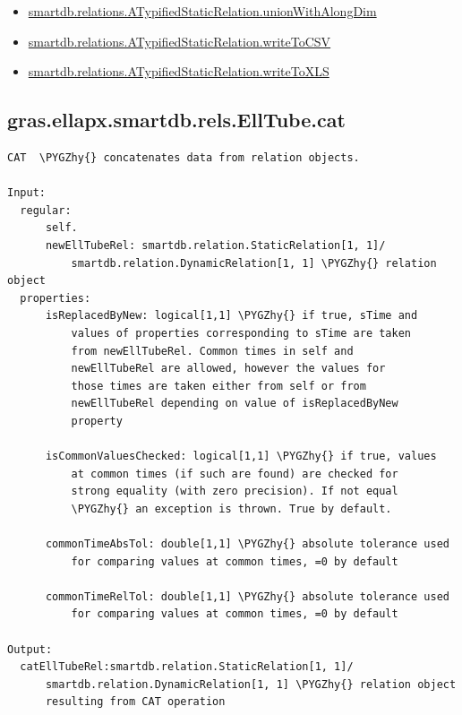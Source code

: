 \documentclass[letterpaper,10pt,english]{sphinxmanual}
\def\PYGZhy{\char`\-}
\begin{document}
\begin{itemize}
\item {} 
{\hyperref[chap_functions:smartdb-relations-atypifiedstaticrelation-unionwithalongdim]{smartdb.relations.ATypifiedStaticRelation.unionWithAlongDim}}

\item {} 
{\hyperref[chap_functions:smartdb-relations-atypifiedstaticrelation-writetocsv]{smartdb.relations.ATypifiedStaticRelation.writeToCSV}}

\item {} 
{\hyperref[chap_functions:smartdb-relations-atypifiedstaticrelation-writetoxls]{smartdb.relations.ATypifiedStaticRelation.writeToXLS}}

\end{itemize}


\subsection{gras.ellapx.smartdb.rels.EllTube.cat}
\label{chap_functions:gras-ellapx-smartdb-rels-elltube-cat}
\begin{Verbatim}[commandchars=\\\{\}]
CAT  \PYGZhy{} concatenates data from relation objects.

Input:
  regular:
      self.
      newEllTubeRel: smartdb.relation.StaticRelation[1, 1]/
          smartdb.relation.DynamicRelation[1, 1] \PYGZhy{} relation object
  properties:
      isReplacedByNew: logical[1,1] \PYGZhy{} if true, sTime and
          values of properties corresponding to sTime are taken
          from newEllTubeRel. Common times in self and
          newEllTubeRel are allowed, however the values for
          those times are taken either from self or from
          newEllTubeRel depending on value of isReplacedByNew
          property

      isCommonValuesChecked: logical[1,1] \PYGZhy{} if true, values
          at common times (if such are found) are checked for
          strong equality (with zero precision). If not equal
          \PYGZhy{} an exception is thrown. True by default.

      commonTimeAbsTol: double[1,1] \PYGZhy{} absolute tolerance used
          for comparing values at common times, =0 by default

      commonTimeRelTol: double[1,1] \PYGZhy{} absolute tolerance used
          for comparing values at common times, =0 by default

Output:
  catEllTubeRel:smartdb.relation.StaticRelation[1, 1]/
      smartdb.relation.DynamicRelation[1, 1] \PYGZhy{} relation object
      resulting from CAT operation
\end{Verbatim}
\end{document}
